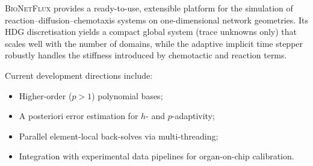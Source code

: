 \documentclass[11pt,a4paper]{article}
\newcommand{\bionetflux}{\textsc{BioNetFlux}}
\begin{document}
\bionetflux{} provides a ready-to-use, extensible platform for
the simulation of reaction--diffusion--chemotaxis systems on
one-dimensional network geometries.  Its HDG discretisation yields
a compact global system (trace unknowns only) that scales well
with the number of domains, while the adaptive implicit time
stepper robustly handles the stiffness introduced by chemotactic
and reaction terms.

Current development directions include:
\begin{itemize}
  \item Higher-order ($p>1$) polynomial bases;
  \item A posteriori error estimation for $h$- and $p$-adaptivity;
  \item Parallel element-local back-solves via multi-threading;
  \item Integration with experimental data pipelines for
        organ-on-chip calibration.
\end{itemize}
\end{document}
